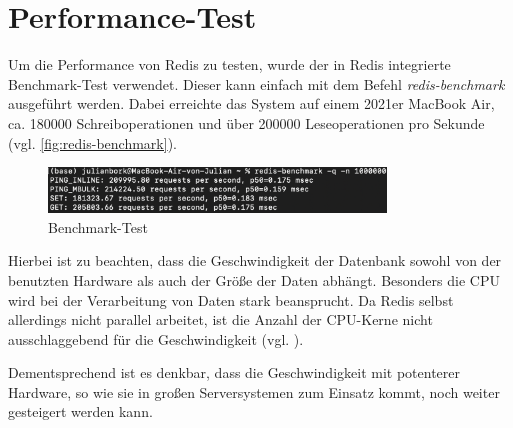 
\section{Performance-Test}
\label{sec:Performance}
Um die Performance von \acs{Redis} zu testen, wurde der in \acs{Redis} integrierte Benchmark-Test verwendet.
Dieser kann einfach mit dem Befehl \textit{redis-benchmark} ausgeführt werden.
Dabei erreichte das System auf einem 2021er MacBook Air, ca. 180000 Schreiboperationen und über 200000 Leseoperationen pro Sekunde (vgl. \autoref{fig:redis-benchmark}).

\begin{figure}[H]
	\centering
	\includegraphics[width=0.8\textwidth]{images/redis-benchmark.png}
	\caption{Benchmark-Test}
	\label{fig:redis-benchmark}
\end{figure}

Hierbei ist zu beachten, dass die Geschwindigkeit der Datenbank sowohl von der benutzten Hardware als auch der Größe der Daten abhängt.
Besonders die CPU wird bei der Verarbeitung von Daten stark beansprucht. Da \acs{Redis} selbst allerdings nicht parallel arbeitet, ist die Anzahl der CPU-Kerne nicht ausschlaggebend für die Geschwindigkeit (vgl. \cite{Redis-Docs-Benchmarks}).

Dementsprechend ist es denkbar, dass die Geschwindigkeit mit potenterer Hardware, so wie sie in großen Serversystemen zum Einsatz kommt, noch weiter gesteigert werden kann.
